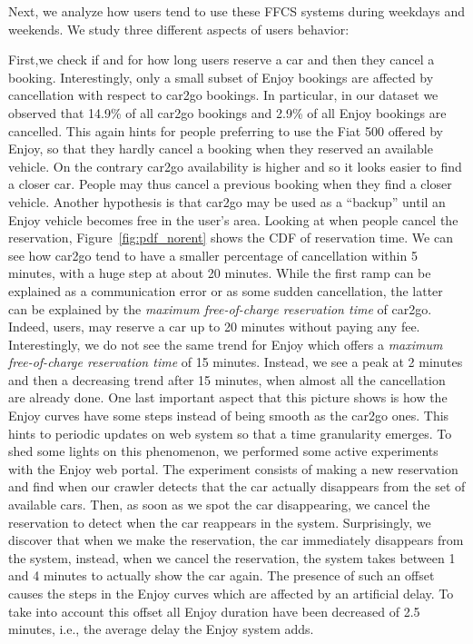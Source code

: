 Next, we analyze how users tend to use these FFCS systems during weekdays and weekends. We study three different aspects of users behavior: 

First,we check {if and} for how long users {reserve a car and then} they cancel a booking. Interestingly, only a small subset of Enjoy bookings are affected by cancellation with respect to car2go bookings. In particular, in our dataset we observed that 14.9\% of all car2go bookings and 2.9\% of all Enjoy bookings are cancelled. This again hints for people preferring to use the Fiat 500 offered by Enjoy, so that they hardly cancel a booking when they reserved an available vehicle. On the contrary car2go availability is higher and so it looks easier to find a closer car. People may thus cancel a previous booking when they find a closer vehicle. Another hypothesis is that car2go may be used as a ``backup'' until an Enjoy vehicle becomes free in the user's area. 
Looking at when people cancel the reservation, Figure~\ref{fig:pdf_norent} shows the CDF of reservation time. We can see how car2go tend to have a smaller percentage of cancellation within 5 minutes, with a huge step at about 20 minutes. While the first ramp can be explained as a communication error or as some sudden cancellation, the latter can be explained by the \textit{maximum free-of-charge reservation time} of car2go. Indeed, users, may reserve a car up to 20 minutes without paying any fee. Interestingly, we do not see the same trend for Enjoy which offers a \textit{maximum free-of-charge reservation time} of 15 minutes. Instead, we see a peak at 2 minutes and then a decreasing trend after 15 minutes, when almost all the cancellation are already done.
One last important aspect that this picture shows is how the Enjoy curves have some steps instead of being smooth as the car2go ones. 
This hints to periodic updates on web system so that a time granularity emerges.
To shed some lights on this phenomenon, we performed some active experiments with the Enjoy web portal. The experiment consists of making a new reservation and find when our crawler detects that the car actually disappears from the set of available cars. Then, as soon as we spot the car disappearing, we cancel the reservation to detect when the car reappears in the system. Surprisingly, we discover that when we make the reservation, the car immediately disappears from the system, instead, when we cancel the reservation, the system takes between 1 and 4 minutes to actually show the car again. The presence of such an offset causes the steps in the Enjoy curves which are affected by an artificial delay. To take into account this offset all Enjoy duration have been decreased of 2.5 minutes, i.e., the average delay the Enjoy system adds. 

